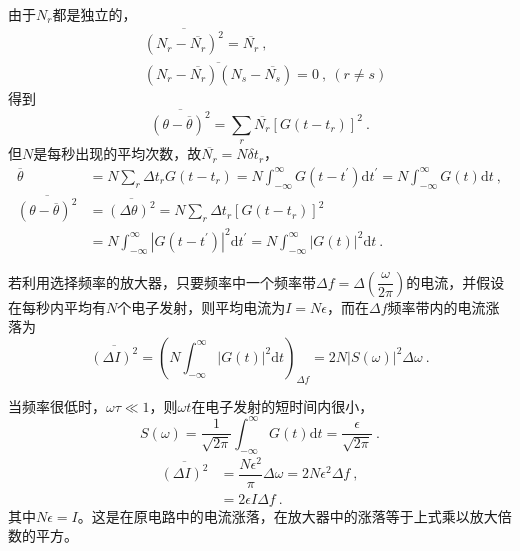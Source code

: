 \documentclass[11pt,a4paper]{article}
\newcommand{\dif}{\mathrm{d}}
\begin{document}
由于$N_r$都是独立的，
\begin{align}
& \overline{(N_r -\overline{N_r})^2} = \overline{N_r} ~, \\
&  \overline{(N_r -\overline{N_r})(N_s -\overline{N_s})} = 0 ~, ~(r \neq s ) 
\end{align}
得到
\begin{equation*}
\overline{(\theta -\overline{\theta})^2} = \sum_r \overline{N_r} [G(t-t_r)]^2 ~.
\end{equation*}
但$N$是每秒出现的平均次数，故$\overline{N_r} = N \delta t_r$，
\begin{align*}
\overline{\theta} &= N \sum_r \Delta t_r G(t-t_r) = N \int_{-\infty}^\infty G(t - t^\prime) \dif t^\prime = N \int_{-\infty}^\infty G(t) \dif t ~, \\
\overline{(\theta -\overline{\theta})^2} &= \overline{(\Delta \theta)^2} = N \sum_r \Delta t_r [G(t-t_r)]^2 \\
&= N \int_{-\infty}^\infty |G(t - t^\prime)|^2 \dif  t^\prime = N \int_{-\infty}^\infty |G(t)|^2 \dif  t ~.
\end{align*}

若利用选择频率的放大器，只要频率中一个频率带$\Delta f = \Delta \left(\dfrac{\omega}{2\pi} \right)$的电流，并假设在每秒内平均有$N$个电子发射，则平均电流为$I = N \epsilon$，而在$\Delta f$频率带内的电流涨落为
\begin{equation}
\overline{(\Delta I)^2} = \left(N \int_{-\infty}^\infty |G(t)|^2 \dif t \right)_{\Delta f} = 2 N |S(\omega)|^2 \Delta \omega ~.
\end{equation}

当频率很低时，$\omega \tau \ll 1$，则$\omega t$在电子发射的短时间内很小，
\begin{equation*}
S(\omega) = \dfrac{1}{\sqrt{2\pi}} \int_{-\infty}^\infty G(t) \dif t = \dfrac{\epsilon}{\sqrt{2\pi}} ~.
\end{equation*}
\begin{align}
\overline{(\Delta I)^2} &= \dfrac{N\epsilon^2}{\pi} \Delta \omega = 2 N\epsilon^2 \Delta f ~, \\
&= 2 \epsilon I \Delta f ~. 
\end{align}
其中$N \epsilon = I$。这是在原电路中的电流涨落，在放大器中的涨落等于上式乘以放大倍数的平方。
\end{document}
